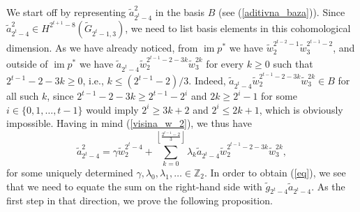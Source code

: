 \documentclass{amsart}
\newcommand{\im}{\operatorname{im}}
\theoremstyle{definition}
\theoremstyle{remark}
\numberwithin{equation}{section}
\begin{document}
We start off by representing $\widetilde a_{2^t-4}^2$ in the basis $B$ (see (\ref{aditivna_baza})). Since $\widetilde a_{2^t-4}^2\in H^{2^{t+1}-8}(\widetilde G_{2^t-1,3})$, we need to list basis elements in this cohomological dimension. As we have already noticed, from $\im p^*$ we have $\widetilde w_2^{2^{t-2}-1}\widetilde w_3^{2^{t-1}-2}$, and outside of $\im p^*$ we have $\widetilde a_{2^t-4} \widetilde w_2^{2^{t-1}-2-3k}\widetilde w_3^{2k}$ for every $k\ge0$ such that $2^{t-1}-2-3k\ge0$, i.e., $k\le(2^{t-1}-2)/3$. Indeed, $\widetilde a_{2^t-4} \widetilde w_2^{2^{t-1}-2-3k}\widetilde w_3^{2k}\in B$ for all such $k$, since $2^{t-1}-2-3k\ge2^{t-1}-2^i$ and $2k\ge2^i-1$ for some $i\in\{0,1,\ldots,t-1\}$ would imply $2^i\ge3k+2$ and $2^i\le2k+1$, which is obviously impossible. Having in mind (\ref{visina_w_2}), we thus have
\begin{equation}\label{a^2_preko_baznih}
    \widetilde a_{2^t-4}^2 = \gamma\widetilde w_2^{2^t-4} + \sum_{k=0}^{\left\lfloor \frac{2^{t-1}-2}{3} \right\rfloor} \lambda_k \widetilde a_{2^t-4} \widetilde w_2^{2^{t-1}-2-3k}\widetilde w_3^{2k},
\end{equation}
for some uniquely determined $\gamma,\lambda_0,\lambda_1,\ldots\in\mathbb Z_2$. In order to obtain (\ref{eq}), we see that we need to equate the sum on the right-hand side with $\widetilde g_{2^t-4}\widetilde a_{2^t-4}$. As the first step in that direction, we prove the following proposition.
\end{document}
